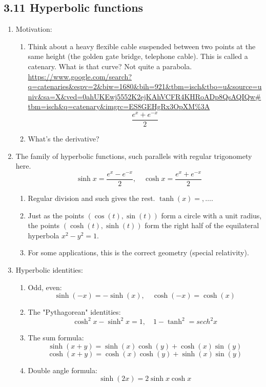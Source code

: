 \documentclass{article}
\begin{document}
\subsection{3.11 Hyperbolic functions}
\begin{enumerate}

\item Motivation:  
\begin{enumerate} 
\item Think about a heavy flexible cable suspended between two points at the same height (the golden gate bridge, telephone cable). This is called a catenary. What is that curve? Not quite a parabola.
\url{https://www.google.com/search?q=catenaries&espv=2&biw=1680&bih=921&tbm=isch&tbo=u&source=univ&sa=X&ved=0ahUKEwj5552K2ejKAhVCFR4KHRoADp8QsAQIQw#tbm=isch&q=catenary&imgrc=ES8GEHgRx3OpXM%3A}
$$
\frac{e^x+e^{-x}}{2}
$$
\item What's the derivative?
\end{enumerate}

\item The family of hyperbolic functions, such parallels with regular trigonomety here.
$$
\sinh x  = \frac{e^x-e^{-x}}{2},\quad\cosh x  = \frac{e^x+e^{-x}}{2}
$$
\begin{enumerate}
\item Regular division and such gives the rest. $\tanh(x)=, \dots$.
\item Just as the points $(\cos(t), \sin(t))$ form a circle with a unit radius, the points $(\cosh(t), \sinh(t))$ form the right half of the equilateral hyperbola $x^2-y^2=1$. 
\item For some applications, this is the correct geometry (special relativity).
\end{enumerate}

\item Hyperbolic identities:
\begin{enumerate}
\item Odd, even:
$$
\sinh(-x) = -\sinh(x),\quad \cosh(-x) = \cosh(x)
$$
\item The "Pythagorean" identities:
$$
\cosh^2 x-\sinh^2 x = 1,\quad 1-\tanh^2  = sech^2x
$$
\item The sum formula:
$$
\sinh(x+y) = \sinh(x)\cosh(y)+\cosh(x)\sin(y)
$$
$$
\cosh(x+y) = \cosh(x)\cosh(y)+\sinh(x)\sin(y)
$$
\item Double angle formula:
$$
\sinh(2x) = 2\sinh x\cosh x
$$
\end{enumerate}


\end{enumerate}
\end{document}
